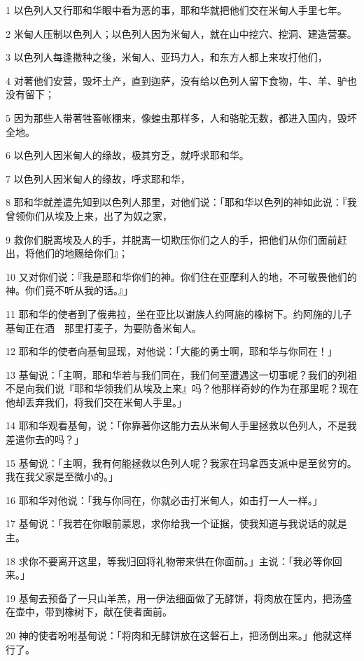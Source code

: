 \par 1 以色列人又行耶和华眼中看为恶的事，耶和华就把他们交在米甸人手里七年。
\par 2 米甸人压制以色列人；以色列人因为米甸人，就在山中挖穴、挖洞、建造营寨。
\par 3 以色列人每逢撒种之後，米甸人、亚玛力人，和东方人都上来攻打他们，
\par 4 对著他们安营，毁坏土产，直到迦萨，没有给以色列人留下食物，牛、羊、驴也没有留下；
\par 5 因为那些人带著牲畜帐棚来，像蝗虫那样多，人和骆驼无数，都进入国内，毁坏全地。
\par 6 以色列人因米甸人的缘故，极其穷乏，就呼求耶和华。
\par 7 以色列人因米甸人的缘故，呼求耶和华，
\par 8 耶和华就差遣先知到以色列人那里，对他们说：「耶和华以色列的神如此说：『我曾领你们从埃及上来，出了为奴之家，
\par 9 救你们脱离埃及人的手，并脱离一切欺压你们之人的手，把他们从你们面前赶出，将他们的地赐给你们』；
\par 10 又对你们说：『我是耶和华你们的神。你们住在亚摩利人的地，不可敬畏他们的神。你们竟不听从我的话。』」
\par 11 耶和华的使者到了俄弗拉，坐在亚比以谢族人约阿施的橡树下。约阿施的儿子基甸正在酒　那里打麦子，为要防备米甸人。
\par 12 耶和华的使者向基甸显现，对他说：「大能的勇士啊，耶和华与你同在！」
\par 13 基甸说：「主啊，耶和华若与我们同在，我们何至遭遇这一切事呢？我们的列祖不是向我们说『耶和华领我们从埃及上来』吗？他那样奇妙的作为在那里呢？现在他却丢弃我们，将我们交在米甸人手里。」
\par 14 耶和华观看基甸，说：「你靠著你这能力去从米甸人手里拯救以色列人，不是我差遣你去的吗？」
\par 15 基甸说：「主啊，我有何能拯救以色列人呢？我家在玛拿西支派中是至贫穷的。我在我父家是至微小的。」
\par 16 耶和华对他说：「我与你同在，你就必击打米甸人，如击打一人一样。」
\par 17 基甸说：「我若在你眼前蒙恩，求你给我一个证据，使我知道与我说话的就是主。
\par 18 求你不要离开这里，等我归回将礼物带来供在你面前。」主说：「我必等你回来。」
\par 19 基甸去预备了一只山羊羔，用一伊法细面做了无酵饼，将肉放在筐内，把汤盛在壶中，带到橡树下，献在使者面前。
\par 20 神的使者吩咐基甸说：「将肉和无酵饼放在这磐石上，把汤倒出来。」他就这样行了。
